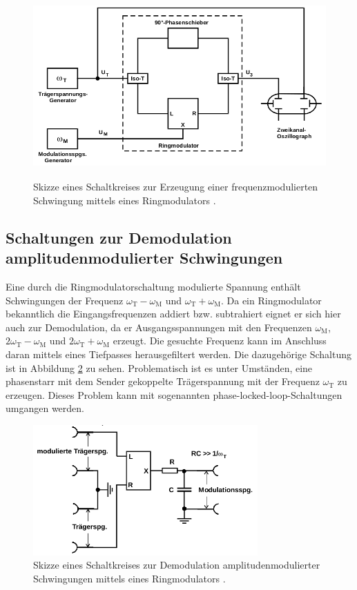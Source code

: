 \begin{figure}
  \centering
  \includegraphics[height=7cm]{JasperErsterSchultag/freqmodschaltung.png}
  \caption{Skizze eines Schaltkreises zur Erzeugung einer frequenzmodulierten Schwingung mittels eines Ringmodulators \cite{anleitung}.}
  \label{fig:freqmodschaltung}
\end{figure}

\subsection{Schaltungen zur Demodulation amplitudenmodulierter Schwingungen}
\label{sec:ampldemod}

Eine durch die Ringmodulatorschaltung modulierte Spannung enthält Schwingungen der
Frequenz $\omega_\text{T}-\omega_\text{M}$ und $\omega_\text{T}+\omega_\text{M}$.
Da ein Ringmodulator bekanntlich die Eingangsfrequenzen addiert bzw. subtrahiert eignet er sich
hier auch zur Demodulation, da er Ausgangsspannungen mit den Frequenzen $\omega_\text{M}$, $2\omega_\text{T} - \omega_\text{M}$ und
$2\omega_\text{T} + \omega_\text{M}$ erzeugt.
Die gesuchte Frequenz kann im Anschluss daran mittels eines Tiefpasses herausgefiltert werden.
Die dazugehörige Schaltung ist in Abbildung \ref{fig:ampldemodschaltung1} zu sehen.
Problematisch ist es unter Umständen, eine phasenstarr mit dem Sender gekoppelte Trägerspannung mit der Frequenz $\omega_\text{T}$
zu erzeugen. Dieses Problem kann mit sogenannten phase-locked-loop-Schaltungen umgangen werden.

\begin{figure}
  \centering
  \includegraphics[height=5cm]{JasperErsterSchultag/ampldemodschaltung1.png}
  \caption{Skizze eines Schaltkreises zur Demodulation amplitudenmodulierter Schwingungen mittels eines Ringmodulators \cite{anleitung}.}
  \label{fig:ampldemodschaltung1}
\end{figure}

